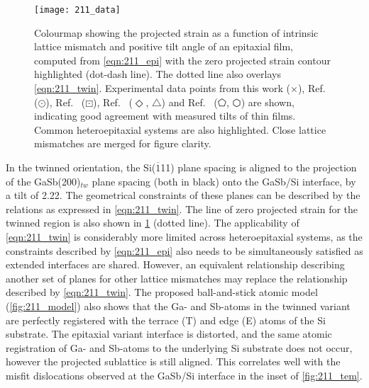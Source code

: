 \begin{figure}
 \centering \texttt{[image: 211\_data]}
 \caption[Colourmap of tilt and intrinsic lattice mismatch of thin films on 211 substrates]{\label{fig:211_data}Colourmap showing the projected strain as a function of intrinsic lattice mismatch and positive tilt angle of an epitaxial film, computed from \cref{eqn:211_epi} with the zero projected strain contour highlighted (dot-dash line).
  The dotted line also overlays \cref{eqn:211_twin}.
  Experimental data points from this work (\(\times\)), Ref.~ (\(\odot\)), Ref.~ (\(\boxdot\)), Ref.~ (\(\Diamond\), \(\bigtriangleup\)) and Ref.~ (\(\pentagon\), \(\varhexagon\)) are shown, indicating good agreement with measured tilts of thin films.
  Common heteroepitaxial systems are also highlighted.
  Close lattice mismatches are merged for figure clarity.}
\end{figure}

In the twinned orientation, the Si(\(\overline{1}\)11) plane spacing is aligned to the projection of the GaSb(200)\(_{tw}\) plane spacing (both in black) onto the GaSb/Si interface, by a tilt of 2.22\degree{}.
The geometrical constraints of these planes can be described by the relations as expressed in \cref{eqn:211_twin}.
The line of zero projected strain for the twinned region is also shown in \cref{fig:211_data} (dotted line).
The applicability of \cref{eqn:211_twin} is considerably more limited across heteroepitaxial systems, as the constraints described by \cref{eqn:211_epi} also needs to be simultaneously satisfied as extended interfaces are shared.
However, an equivalent relationship describing another set of planes for other lattice mismatches may replace the relationship described by \cref{eqn:211_twin}.
The proposed ball-and-stick atomic model (\cref{fig:211_model}) also shows that the Ga- and Sb-atoms in the twinned variant are perfectly registered with the terrace (T) and edge (E) atoms of the Si substrate.
The epitaxial variant interface is distorted, and the same atomic registration of Ga- and Sb-atoms to the underlying Si substrate does not occur, however the projected sublattice is still aligned.
This correlates well with the misfit dislocations observed at the GaSb/Si interface in the inset of \cref{fig:211_tem}.

